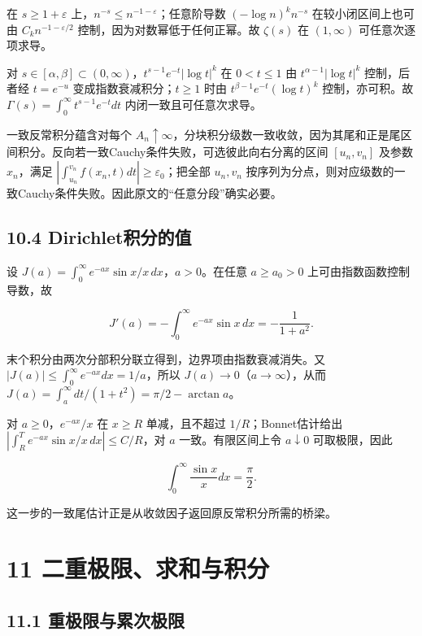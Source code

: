 \documentclass[11pt,a4paper]{article}
\begin{document}
在 \(s\ge1+\varepsilon\)
上，\(n^{-s}\le n^{-1-\varepsilon}\)；任意阶导数 \((-\log n)^kn^{-s}\)
在较小闭区间上也可由 \(C_kn^{-1-\varepsilon/2}\)
控制，因为对数幂低于任何正幂。故 \(\zeta(s)\) 在 \((1,\infty)\)
可任意次逐项求导。

对 \(s\in[\alpha,\beta]\subset(0,\infty)\)，\(t^{s-1}e^{-t}|\log t|^k\)
在 \(0<t\le1\) 由 \(t^{\alpha-1}|\log t|^k\) 控制，后者经 \(t=e^{-u}\)
变成指数衰减积分；\(t\ge1\) 时由 \(t^{\beta-1}e^{-t}(\log t)^k\)
控制，亦可积。故 \(\Gamma(s)=\int_0^\infty t^{s-1}e^{-t}dt\)
内闭一致且可任意次求导。

一致反常积分蕴含对每个
\(A_n\uparrow\infty\)，分块积分级数一致收敛，因为其尾和正是尾区间积分。反向若一致Cauchy条件失败，可选彼此向右分离的区间
\([u_n,v_n]\) 及参数 \(x_n\)，满足
\(|\int_{u_n}^{v_n}f(x_n,t)dt|\ge\varepsilon_0\)；把全部 \(u_n,v_n\)
按序列为分点，则对应级数的一致Cauchy条件失败。因此原文的``任意分段''确实必要。

\subsection{10.4
Dirichlet积分的值}\label{dirichletux79efux5206ux7684ux503c}

设 \(J(a)=\int_0^\infty e^{-ax}\sin x/x\,dx\)，\(a>0\)。在任意
\(a\ge a_0>0\) 上可由指数函数控制导数，故

\[
J'(a)=-\int_0^\infty e^{-ax}\sin x\,dx=-\frac1{1+a^2}.
\]

末个积分由两次分部积分联立得到，边界项由指数衰减消失。又
\(|J(a)|\le\int_0^\infty e^{-ax}dx=1/a\)，所以
\(J(a)\to0\)（\(a\to\infty\)），从而
\(J(a)=\int_a^\infty dt/(1+t^2)=\pi/2-\arctan a\)。

对 \(a\ge0\)，\(e^{-ax}/x\) 在 \(x\ge R\) 单减，且不超过
\(1/R\)；Bonnet估计给出 \(|\int_R^Te^{-ax}\sin x/x\,dx|\le C/R\)，对
\(a\) 一致。有限区间上令 \(a\downarrow0\) 可取极限，因此

\[
\int_0^\infty\frac{\sin x}{x}dx=\frac\pi2.\tag{10.1}
\]

这一步的一致尾估计正是从收敛因子返回原反常积分所需的桥梁。

\clearpage

\section{11
二重极限、求和与积分}\label{ux4e8cux91cdux6781ux9650ux6c42ux548cux4e0eux79efux5206}

\subsection{11.1
重极限与累次极限}\label{ux91cdux6781ux9650ux4e0eux7d2fux6b21ux6781ux9650}
\end{document}

